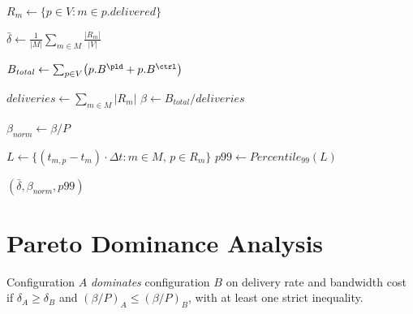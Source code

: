 \documentclass{article}
\begin{document}

\begin{algorithm}[H]
\caption{Compute Final Metrics}
\label{alg:metrics}
\begin{algorithmic}[1]
    \State {}
    \State $R_m \gets \{p \in V : m \in p.\mathit{delivered}\}$
    
    \State {}
    \State $\bar{\delta} \gets \frac{1}{|M|} \sum_{m \in M} \frac{|R_m|}{|V|}$
    
    \State {}
    \State $B_{\mathit{total}} \gets \sum_{p \in V} \bigl(p.B^{\pld} + p.B^{\ctrl}\bigr)$
    
    \State {}
    \State $\mathit{deliveries} \gets \sum_{m \in M} |R_m|$
    \State $\beta \gets B_{\mathit{total}} / \mathit{deliveries}$
    
    \State {}
    \State $\beta_{\mathit{norm}} \gets \beta / P$ 
    
    \State {}
    \State $L \gets \{(t_{m,p} - t_m) \cdot \Delta t : m \in M, \, p \in R_m\}$
    \State $p99 \gets \mathit{Percentile}_{99}(L)$
    
    \State \Return $(\bar{\delta}, \beta_{\mathit{norm}}, p99)$
\EndFunction
\end{algorithmic}
\end{algorithm}


\section{Pareto Dominance Analysis}
\label{sec:pareto-algorithm}

\begin{definition}
      Configuration $A$ \emph{dominates} configuration $B$ on delivery
rate and bandwidth cost if
      $\delta_A \geq \delta_B$ and $(\beta/P)_A \leq (\beta/P)_B$,
      with at least one strict inequality.
\end{definition}
\end{document}
